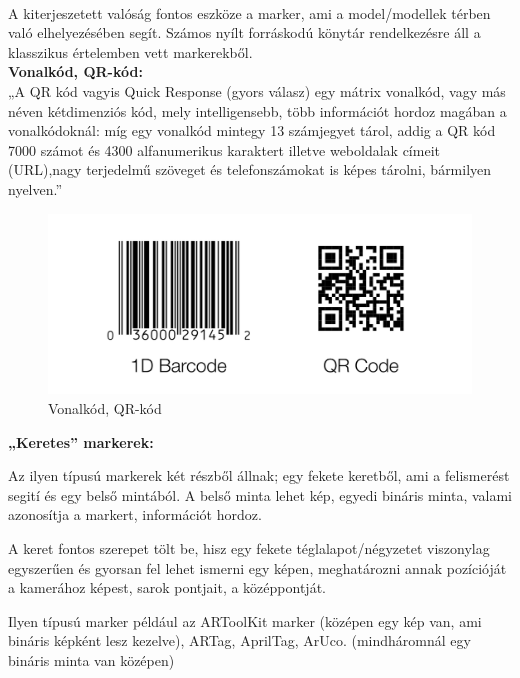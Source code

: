 

\\
A kiterjeszetett valóság fontos eszköze a marker, ami a model/modellek térben való elhelyezésében segít. Számos nyílt forráskodú könytár rendelkezésre áll a klasszikus értelemben vett markerekből.\\

{\bf Vonalkód, QR-kód:}\\
„A  QR  kód vagyis Quick  Response  (gyors  válasz) egy  mátrix  vonalkód,  vagy  más  néven kétdimenziós kód, mely intelligensebb, több információt hordoz magában a vonalkódoknál: míg egy vonalkód mintegy 13 számjegyet tárol, addig a QR kód 7000 számot és 4300 alfanumerikus karaktert illetve weboldalak címeit (URL),nagy terjedelmű szöveget és telefonszámokat is képes tárolni, bármilyen nyelven.”\\

\begin{figure}[htp]
    \centering
   	\includegraphics[width=4.8truecm, height=2truecm]{images/qr_bar.png}
	\caption{Vonalkód, QR-kód}
\end{figure}

{\bf „Keretes” markerek:}

Az ilyen típusú markerek két részből állnak; egy fekete keretből, ami a felismerést segití és egy belső mintából. A belső minta lehet kép, egyedi bináris minta, valami azonosítja a markert, információt hordoz.

A keret fontos szerepet tölt be, hisz egy fekete téglalapot/négyzetet viszonylag egyszerűen és gyorsan fel lehet ismerni egy képen, meghatározni annak pozícióját a kamerához képest, sarok pontjait, a középpontját.

Ilyen típusú marker például az ARToolKit marker (középen egy kép van, ami bináris képként lesz kezelve), ARTag, AprilTag, ArUco. (mindháromnál egy bináris minta van középen)

